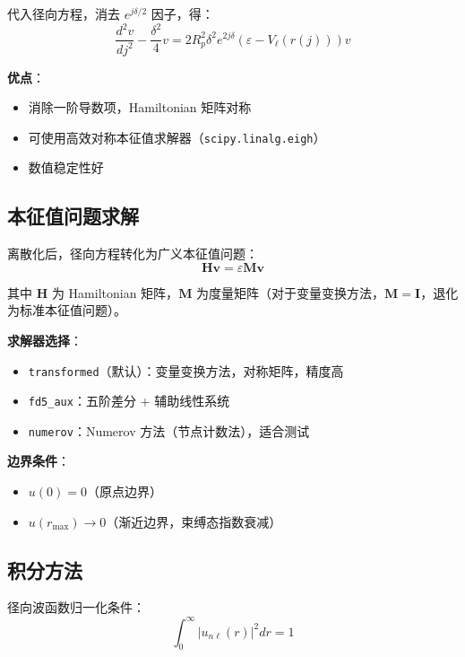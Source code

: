 \documentclass[12pt,a4paper]{article}
\begin{document}
代入径向方程，消去 $e^{j\delta/2}$ 因子，得：
\begin{equation}
    \frac{d^2v}{dj^2} - \frac{\delta^2}{4}v = 2R_p^2\delta^2 e^{2j\delta} \left( \varepsilon - V_{\ell}(r(j)) \right) v
\end{equation}

\textbf{优点}：
\begin{itemize}
    \item 消除一阶导数项，Hamiltonian 矩阵对称
    \item 可使用高效对称本征值求解器（\texttt{scipy.linalg.eigh}）
    \item 数值稳定性好
\end{itemize}

\subsection{本征值问题求解}

离散化后，径向方程转化为广义本征值问题：
\begin{equation}
    \mathbf{H} \mathbf{v} = \varepsilon \mathbf{M} \mathbf{v}
\end{equation}

其中 $\mathbf{H}$ 为 Hamiltonian 矩阵，$\mathbf{M}$ 为度量矩阵（对于变量变换方法，$\mathbf{M} = \mathbf{I}$，退化为标准本征值问题）。

\textbf{求解器选择}：
\begin{itemize}
    \item \texttt{transformed}（默认）：变量变换方法，对称矩阵，精度高
    \item \texttt{fd5\_aux}：五阶差分 + 辅助线性系统
    \item \texttt{numerov}：Numerov 方法（节点计数法），适合测试
\end{itemize}

\textbf{边界条件}：
\begin{itemize}
    \item $u(0) = 0$（原点边界）
    \item $u(r_{\max}) \to 0$（渐近边界，束缚态指数衰减）
\end{itemize}

\subsection{积分方法}

径向波函数归一化条件：
\begin{equation}
    \int_0^\infty |u_{n\ell}(r)|^2 dr = 1
\end{equation}
\end{document}
